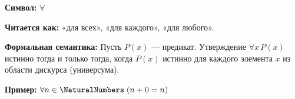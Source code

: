 

\hypertarget{axiom-forall}{}
\begin{object} %



\textbf{Символ:} $\forall$

\textbf{Читается как:} «для всех», «для каждого», «для любого».

\textbf{Формальная семантика:}
Пусть $P(x)$ — предикат. Утверждение $\forall x\, P(x)$ истинно тогда и только тогда,
когда $P(x)$ истинно для каждого элемента $x$ из области дискурса (универсума).

\textbf{Пример:} $\forall n \in \NaturalNumbers\; (n + 0 = n)$
\end{object}